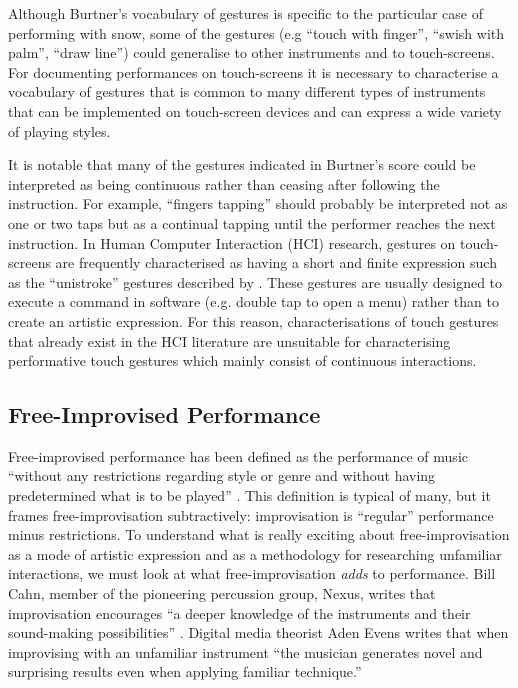 \documentclass[graybox]{svmult}
\begin{document}
Although Burtner's vocabulary of gestures is specific to the
particular case of performing with snow, some of the gestures (e.g
``touch with finger'', ``swish with palm'', ``draw line'') could
generalise to other instruments and to touch-screens. For documenting
performances on touch-screens it is necessary to characterise a
vocabulary of gestures that is common to many different types of
instruments that can be implemented on touch-screen devices and can
express a wide variety of playing styles.

It is notable that many of the gestures indicated in Burtner's score
could be interpreted as being continuous rather than ceasing after 
following the instruction. For example, ``fingers tapping'' should
probably be interpreted not as one or two taps but as a continual
tapping until the performer reaches the next instruction. In Human Computer 
Interaction (HCI) 
research, gestures on touch-screens are frequently characterised as 
having a short and finite expression such as the ``unistroke''
gestures described by \citet{Wobbrock:2007kq}. These
gestures are usually designed to execute a command in software (e.g.
double tap to open a menu) rather than to create an artistic
expression. For this reason, characterisations of touch gestures that
already exist in the HCI literature are unsuitable for characterising
performative touch gestures which mainly consist of continuous
interactions.

\subsection{Free-Improvised Performance}
\label{subsec:free-improvisation}

Free-improvised performance has been defined as the performance of
music ``without any restrictions regarding style or genre and without
having predetermined what is to be played'' \citep{Stenstrom:2009xy}.
This definition is typical of many, but it frames
free-improvisation subtractively: improvisation is ``regular''
performance minus restrictions. To understand what is really exciting
about free-improvisation as a mode of artistic expression and as a
methodology for researching unfamiliar interactions, we must look at
what free-improvisation \emph{adds} to performance. Bill Cahn, member
of the pioneering percussion group, Nexus, writes that improvisation
encourages ``a deeper knowledge of the instruments and their
sound-making possibilities'' \citep{Cahn:2005uq}. Digital media
theorist Aden Evens writes that when improvising with an unfamiliar
instrument ``the musician generates novel and surprising results even
when applying familiar technique.'' \citep{Evens:2005kx}
\end{document}
